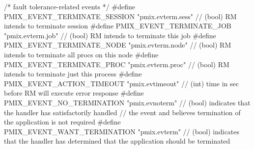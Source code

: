 \begin{codepar}
/* fault tolerance-related events */
#define PMIX_EVENT_TERMINATE_SESSION        "pmix.evterm.sess"      // (bool) RM intends to terminate session
#define PMIX_EVENT_TERMINATE_JOB            "pmix.evterm.job"       // (bool) RM intends to terminate this job
#define PMIX_EVENT_TERMINATE_NODE           "pmix.evterm.node"      // (bool) RM intends to terminate all procs on this node
#define PMIX_EVENT_TERMINATE_PROC           "pmix.evterm.proc"      // (bool) RM intends to terminate just this process
#define PMIX_EVENT_ACTION_TIMEOUT           "pmix.evtimeout"        // (int) time in sec before RM will execute error response
#define PMIX_EVENT_NO_TERMINATION           "pmix.evnoterm"         // (bool) indicates that the handler has satisfactorily handled
                                                                    //        the event and believes termination of the application is not required
#define PMIX_EVENT_WANT_TERMINATION         "pmix.evterm"           // (bool) indicates that the handler has determined that the application should be terminated


\end{codepar}
